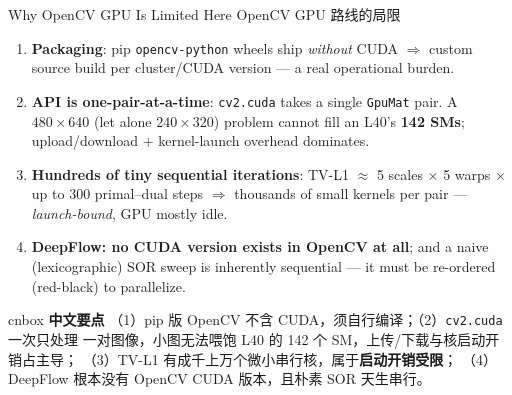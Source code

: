 \documentclass[aspectratio=169,10pt]{beamer}
\newcommand{\zh}[1]{{\zhfont #1}}
\newenvironment{cn}{%
  \begin{beamercolorbox}[rounded=true,sep=4pt,wd=\textwidth]{cnbox}\zhfont\footnotesize
  {\color{cblue!70!black}\textbf{中文要点}}\quad}%
  {\end{beamercolorbox}}
\begin{document}
\begin{frame}{Why OpenCV GPU Is Limited Here \zh{OpenCV GPU 路线的局限}}
  \begin{enumerate}\itemsep3pt
    \item \textbf{Packaging}: pip \texttt{opencv-python} wheels ship
      \emph{without} CUDA $\Rightarrow$ custom source build per
      cluster/CUDA version --- a real operational burden.
    \item \textbf{API is one-pair-at-a-time}: \texttt{cv2.cuda} takes a single
      \texttt{GpuMat} pair. A $480{\times}640$ (let alone $240{\times}320$)
      problem cannot fill an L40's \textbf{142 SMs}; upload/download +
      kernel-launch overhead dominates.
    \item \textbf{Hundreds of tiny sequential iterations}: TV-L1 $\approx$
      5 scales $\times$ 5 warps $\times$ up to 300 primal--dual steps
      $\Rightarrow$ thousands of small kernels per pair --- \emph{launch-bound},
      GPU mostly idle.
    \item \textbf{DeepFlow: no CUDA version exists in OpenCV at all}; and a
      naive (lexicographic) SOR sweep is inherently sequential --- it must be
      re-ordered (red-black) to parallelize.
  \end{enumerate}
  \vfill
  \begin{cn}
    （1）pip 版 OpenCV 不含 CUDA，须自行编译；（2）\texttt{cv2.cuda} 一次只处理
    一对图像，小图无法喂饱 L40 的 142 个 SM，上传/下载与核启动开销占主导；
    （3）TV-L1 有成千上万个微小串行核，属于\textbf{启动开销受限}；
    （4）DeepFlow 根本没有 OpenCV CUDA 版本，且朴素 SOR 天生串行。
  \end{cn}
\end{frame}
\end{document}

